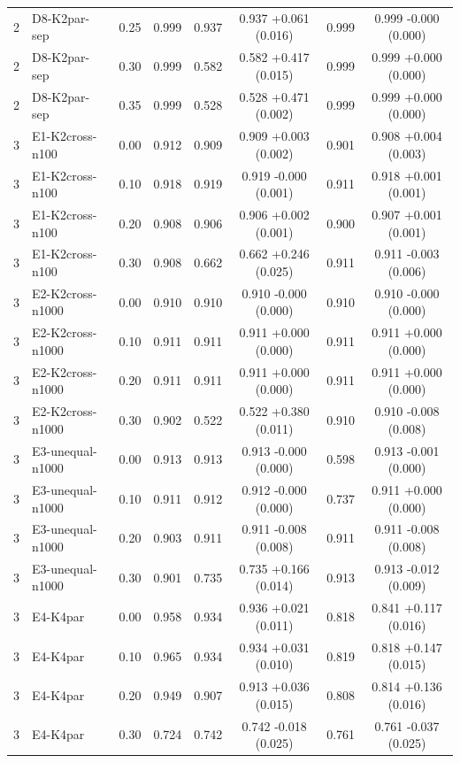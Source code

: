 {\begin{longtable}{llcccccc}
2 & D8-K2par-sep & 0.25 & 0.999 & 0.937 & 0.937 +0.061 (0.016) & 0.999 & 0.999 -0.000 (0.000) \\
2 & D8-K2par-sep & 0.30 & 0.999 & 0.582 & 0.582 +0.417 (0.015) & 0.999 & 0.999 +0.000 (0.000) \\
2 & D8-K2par-sep & 0.35 & 0.999 & 0.528 & 0.528 +0.471 (0.002) & 0.999 & 0.999 +0.000 (0.000) \\
3 & E1-K2cross-n100 & 0.00 & 0.912 & 0.909 & 0.909 +0.003 (0.002) & 0.901 & 0.908 +0.004 (0.003) \\
3 & E1-K2cross-n100 & 0.10 & 0.918 & 0.919 & 0.919 -0.000 (0.001) & 0.911 & 0.918 +0.001 (0.001) \\
3 & E1-K2cross-n100 & 0.20 & 0.908 & 0.906 & 0.906 +0.002 (0.001) & 0.900 & 0.907 +0.001 (0.001) \\
3 & E1-K2cross-n100 & 0.30 & 0.908 & 0.662 & 0.662 +0.246 (0.025) & 0.911 & 0.911 -0.003 (0.006) \\
3 & E2-K2cross-n1000 & 0.00 & 0.910 & 0.910 & 0.910 -0.000 (0.000) & 0.910 & 0.910 -0.000 (0.000) \\
3 & E2-K2cross-n1000 & 0.10 & 0.911 & 0.911 & 0.911 +0.000 (0.000) & 0.911 & 0.911 +0.000 (0.000) \\
3 & E2-K2cross-n1000 & 0.20 & 0.911 & 0.911 & 0.911 +0.000 (0.000) & 0.911 & 0.911 +0.000 (0.000) \\
3 & E2-K2cross-n1000 & 0.30 & 0.902 & 0.522 & 0.522 +0.380 (0.011) & 0.910 & 0.910 -0.008 (0.008) \\
3 & E3-unequal-n1000 & 0.00 & 0.913 & 0.913 & 0.913 -0.000 (0.000) & 0.598 & 0.913 -0.001 (0.000) \\
3 & E3-unequal-n1000 & 0.10 & 0.911 & 0.912 & 0.912 -0.000 (0.000) & 0.737 & 0.911 +0.000 (0.000) \\
3 & E3-unequal-n1000 & 0.20 & 0.903 & 0.911 & 0.911 -0.008 (0.008) & 0.911 & 0.911 -0.008 (0.008) \\
3 & E3-unequal-n1000 & 0.30 & 0.901 & 0.735 & 0.735 +0.166 (0.014) & 0.913 & 0.913 -0.012 (0.009) \\
3 & E4-K4par & 0.00 & 0.958 & 0.934 & 0.936 +0.021 (0.011) & 0.818 & 0.841 +0.117 (0.016) \\
3 & E4-K4par & 0.10 & 0.965 & 0.934 & 0.934 +0.031 (0.010) & 0.819 & 0.818 +0.147 (0.015) \\
3 & E4-K4par & 0.20 & 0.949 & 0.907 & 0.913 +0.036 (0.015) & 0.808 & 0.814 +0.136 (0.016) \\
3 & E4-K4par & 0.30 & 0.724 & 0.742 & 0.742 -0.018 (0.025) & 0.761 & 0.761 -0.037 (0.025) \\

\end{longtable}}
